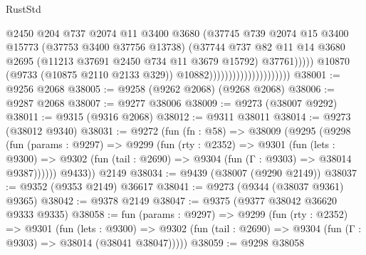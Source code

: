 \begin{lexlean}{RustStd}
\begin{coremodule}
                                                    @2450
                                                    @204
                                                    @737
                                                    @2074
                                                    @11
                                                    @3400
                                                    @3680
                                                    (@37745
                                                      @739
                                                      @2074
                                                      @15
                                                      @3400
                                                      @15773
                                                      (@37753 @3400 @37756 @13738)
                                                      (@37744
                                                        @737
                                                        @82
                                                        @11
                                                        @14
                                                        @3680
                                                        @2695
                                                        (@11213 @37691 @2450 @734 @11 @3679 @15792)
                                                        @37761)))))
                                              @10870
                                              (@9733 (@10875 @2110 @2133 @329))
                                              @10882)))))))))))))))))))))
@38001 := @9256 @2068
@38005 := @9258 (@9262 @2068) (@9268 @2068)
@38006 := @9287 @2068
@38007 := @9277 @38006
@38009 := @9273 (@38007 @9292)
@38011 := @9315 (@9316 @2068)
@38012 := @9311 @38011
@38014 := @9273 (@38012 @9340)
@38031 := @9272
    (fun (fn : @58) =>
    @38009
      (@9295
        (@9298
          (fun (params : @9297) =>
          @9299
            (fun (rty : @2352) =>
            @9301
              (fun (lets : @9300) =>
              @9302 (fun (tail : @2690) => @9304 (fun (Γ : @9303) => @38014 @9387))))))
        @9433))
    @2149
@38034 := @9439 (@38007 (@9290 @2149))
@38037 := @9352 (@9353 @2149) @36617
@38041 := @9273 (@9344 (@38037 @9361) @9365)
@38042 := @9378 @2149
@38047 := @9375 (@9377 @38042 @36620 @9333 @9335)
@38058 := fun (params : @9297) =>
  @9299
    (fun (rty : @2352) =>
    @9301
      (fun (lets : @9300) =>
      @9302 (fun (tail : @2690) => @9304 (fun (Γ : @9303) => @38014 (@38041 @38047)))))
@38059 := @9298 @38058

\end{coremodule}
\end{lexlean}
